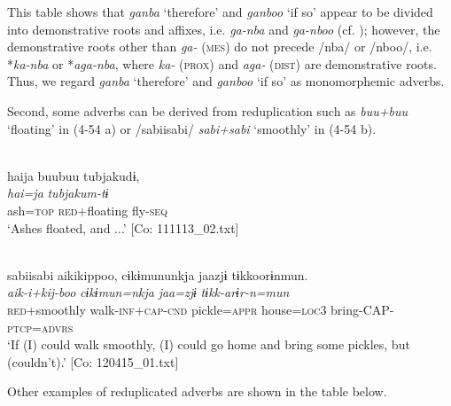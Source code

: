 This table shows that \textit{ganba} ‘therefore’ and \textit{ganboo} ‘if so’ appear to be divided into demonstrative roots and affixes, i.e. \textit{ga-nba} and \textit{ga-nboo} (cf. ); however, the demonstrative roots other than \textit{ga-} (\textsc{mes}) do not precede /nba/ or /nboo/, i.e. *\textit{ka-nba} or *\textit{aga-nba}, where \textit{ka-} (\textsc{prox}) and \textit{aga-} (\textsc{dist}) are demonstrative roots. Thus, we regard \textit{ganba} ‘therefore’ and \textit{ganboo} ‘if so’ as monomorphemic adverbs.

Second, some adverbs can be derived from reduplication such as \textit{buu+buu} ‘floating’ in (4-54 a) or /sabiisabi/ \textit{sabi+sabi} ‘smoothly’ in (4-54 b).

\ea  \label{ex:4.54}
\ea{}\\\label{ex:4.54a}
\glll    haija  buubuu  tubjakudɨ,\\
      \textit{hai=ja}  \textit{}  \textit{tubjakum-tɨ}\\
      ash=\textsc{top}  \textsc{red}+floating  fly-\textsc{seq}\\
    \glt       ‘Ashes floated, and ...’ [Co: 111113\_02.txt]

\ex{}\\\label{ex:4.54b}
\glll sabiisabi  aikikippoo,  cɨkɨmununkja  jaazjɨ  tɨkkoorɨnmun.\\
      \textit{}  \textit{aik-i+kij-boo}  \textit{cɨkɨmun=nkja}  \textit{jaa=zjɨ}  \textit{tɨkk-arɨr-n=mun}\\
      \textsc{red}+smoothly  walk-\textsc{inf}+\textsc{cap}-\textsc{cnd}  pickle=\textsc{appr}   house=\textsc{loc}3  bring-CAP-\textsc{ptcp}=\textsc{advrs}\\
      \glt ‘If (I) could walk smoothly, (I) could go home and bring some pickles, but (couldn’t).’   [Co: 120415\_01.txt]
    \z
\z

Other examples of reduplicated adverbs are shown in the table below.

